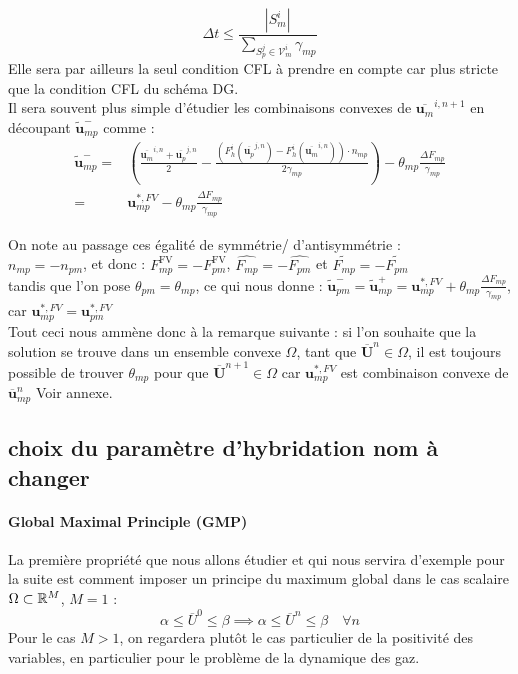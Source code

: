 \begin{equation}
    \Delta t \leq \frac{|S_m^i|}{\sum_{S_p^j \in \mathcal{V}_m^i} \gamma_{mp}}
\end{equation} 
Elle sera par ailleurs la seul condition CFL à prendre en compte car plus stricte que la condition CFL du schéma DG.\\ 

Il sera souvent plus simple d'étudier les combinaisons convexes de $\overline{\mathbf{u}_m}^{i,n+1}$ en découpant $ \widetilde{\mathbf{u}}_{mp}^-$ comme : 
\begin{equation}
\begin{aligned}
    \widetilde{\mathbf{u}}_{mp}^- =& \left( \frac{\overline{\mathbf{u}_m}^{i,n}+ \overline{\mathbf{u}_p}^{j,n}}{2} - \frac{(F_h^i(\overline{\mathbf{u}_p}^{j,n}) - F_h^i(\overline{\mathbf{u}_m}^{i,n})   )\cdot n_{mp}}{2 \gamma_{mp}}   \right) - \theta_{mp} \frac{\Delta F_{mp}}{\gamma_{mp}} \\
    =& \mathbf{u}_{mp}^{*,FV} - \theta_{mp} \frac{\Delta F_{mp}}{\gamma_{mp}}
\end{aligned}    
\end{equation}

On note au passage ces égalité de symmétrie/ d'antisymmétrie : \\
$n_{mp}= -n_{pm}$, et donc : $F^{\text{FV}}_{mp} = - F^{\text{FV}}_{pm}$, $\widehat{F_{mp}} = -\widehat{F_{pm}}$ et $\widetilde{F_{mp}} = -\widetilde{F_{pm}}$\\
tandis que l'on pose $\theta_{pm} = \theta_{mp}$, ce qui nous donne : $\widetilde{\mathbf{u}}_{pm}^- = \widetilde{\mathbf{u}}_{mp}^+ = \mathbf{u}_{mp}^{*,FV} + \theta_{mp} \frac{\Delta F_{mp}}{\gamma_{mp}}$, car $ \mathbf{u}_{mp}^{*,FV} = \mathbf{u}_{pm}^{*,FV}$ \\

Tout ceci nous ammène donc à la remarque suivante : si l'on souhaite que la solution se trouve dans un ensemble convexe $\Omega$, tant que $\overline{\mathbf{U}}^{n} \in \Omega$, 
il est toujours possible de trouver $\theta_{mp}$ pour que $\overline{\mathbf{U}}^{n+1} \in \Omega$ car $\mathbf{u}_{mp}^{*,FV}$ est combinaison convexe de $ \overline{\mathbf{u}}_{mp}^{n}$ {\color{red} Voir annexe}.

\subsection{choix du paramètre d'hybridation {\color{red} nom à changer}}

\paragraph{Global Maximal Principle (GMP)}
La première propriété que nous allons étudier et qui nous servira d'exemple pour la suite est comment imposer un principe du maximum global dans le cas scalaire $\Omega \subset \mathbb{R}^M$, $M=1$ : 
$$ \alpha \leq \overline{U}^{0} \leq \beta \implies \alpha \leq \overline{U}^{n} \leq \beta \quad \forall n$$
Pour le cas $M>1$, on regardera plutôt le cas particulier de la positivité des variables, en particulier pour le problème de la dynamique des gaz.

